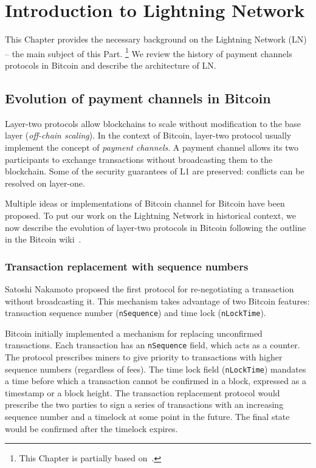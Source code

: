 \chapter{Introduction to Lightning Network}

\label{Chapter05IntroLightning}

This Chapter provides the necessary background on the Lightning Network (LN) -- the main subject of this Part.
\footnote{This Chapter is partially based on~\cite{Tikhomirov2020a}.}
We review the history of payment channels protocols in Bitcoin and describe the architecture of LN.


\section{Evolution of payment channels in Bitcoin}

Layer-two protocols allow blockchains to scale without modification to the base layer (\textit{off-chain scaling}).
In the context of Bitcoin, layer-two protocol usually implement the concept of \textit{payment channels}.
A payment channel allows its two participants to exchange transactions without broadcasting them to the blockchain.
Some of the security guarantees of L1 are preserved: conflicts can be resolved on layer-one.

Multiple ideas or implementations of Bitcoin channel for Bitcoin have been proposed.
To put our work on the Lightning Network in historical context, we now describe the evolution of layer-two protocols in Bitcoin following the outline in the Bitcoin wiki~\cite{BitcoinWikiChannels}.

\subsection{Transaction replacement with sequence numbers}

Satoshi Nakamoto proposed the first protocol for re-negotiating a transaction without broadcasting it.
This mechanism takes advantage of two Bitcoin features: transaction sequence number (\texttt{nSequence}) and time lock (\texttt{nLockTime}).

Bitcoin initially implemented a mechanism for replacing unconfirmed transactions.
Each transaction has an \texttt{nSequence} field, which acts as a counter.
The protocol prescribes miners to give priority to transactions with higher sequence numbers (regardless of fees).
The time lock field (\texttt{nLockTime}) mandates a time before which a transaction cannot be confirmed in a block, expressed as a timestamp or a block height.
The transaction replacement protocol would prescribe the two parties to sign a series of transactions with an increasing sequence number and a timelock at some point in the future.
The final state would be confirmed after the timelock expires.

